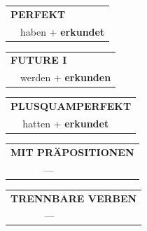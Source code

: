 \documentclass[10pt,a4paper]{revtex4-2}
\begin{document}
\begin{verbbox-acc}
\vspace{10pt}

\begin{tabular}{rl}
\multicolumn{2}{l}{\textbf{PERFEKT}}\\
& haben + \textbf{erkundet}\\
\end{tabular}
\hfill
\begin{tabular}{rl}
\multicolumn{2}{l}{\textbf{FUTURE I}}\\
& werden + \textbf{erkunden}\\
\end{tabular}
\hfill
\begin{tabular}{rl}
\multicolumn{2}{l}{\textbf{PLUSQUAMPERFEKT}}\\
& hatten + \textbf{erkundet}\\
\end{tabular}

\vspace{10pt}

\begin{tabular}{lll}
\multicolumn{3}{l}{\textbf{MIT PRÄPOSITIONEN}}\\
& ---\\
\end{tabular}
\hfill
\begin{tabular}{lll}
\multicolumn{3}{l}{\textbf{TRENNBARE VERBEN}}\\
& ---\\
\end{tabular}

\vspace{-5pt}
\end{verbbox-acc}
\end{document}
